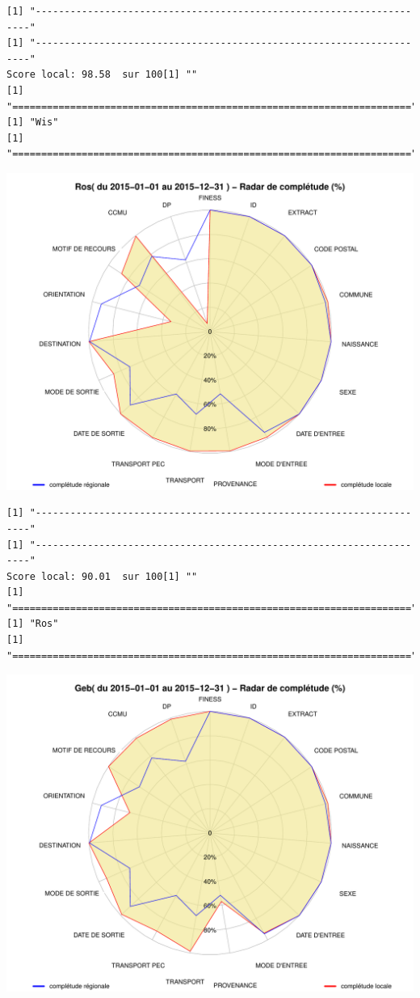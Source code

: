 \documentclass[]{article}
\begin{document}
\begin{verbatim}
[1] "---------------------------------------------------------------------"
[1] "---------------------------------------------------------------------"
Score local: 98.58  sur 100[1] ""
[1] "====================================================================="
[1] "Wis"
[1] "====================================================================="
\end{verbatim}

\includegraphics{completude_files/figure-latex/finess-10.pdf}

\begin{verbatim}
[1] "---------------------------------------------------------------------"
[1] "---------------------------------------------------------------------"
Score local: 90.01  sur 100[1] ""
[1] "====================================================================="
[1] "Ros"
[1] "====================================================================="
\end{verbatim}

\includegraphics{completude_files/figure-latex/finess-11.pdf}
\end{document}
